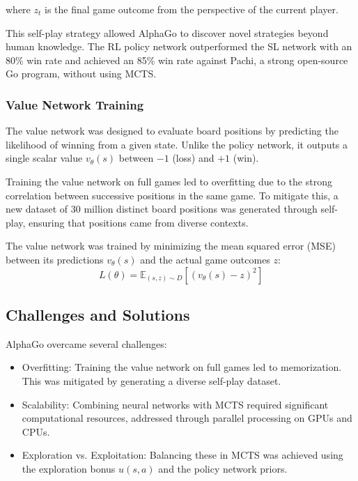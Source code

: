 where \( z_t \) is the final game outcome from the perspective of the current
player.

This self-play strategy allowed AlphaGo to discover novel strategies beyond
human knowledge. The RL policy network outperformed the SL network with an 80\%
win rate and achieved an 85\% win rate against Pachi, a strong open-source Go
program, without using MCTS.

\subsubsection{Value Network Training}
The value network was designed to evaluate board positions by predicting the
likelihood of winning from a given state. Unlike the policy network, it outputs
a single scalar value \( v_\theta(s) \) between \(-1\) (loss) and \(+1\) (win).

Training the value network on full games led to overfitting due to the strong
correlation between successive positions in the same game. To mitigate this, a
new dataset of 30 million distinct board positions was generated through
self-play, ensuring that positions came from diverse contexts.

The value network was trained by minimizing the mean squared error (MSE)
between its predictions \( v_\theta(s) \) and the actual game outcomes \( z \):
\begin{equation}
    L(\theta) = \mathbb{E}_{(s, z) \sim D} \left[ (v_\theta(s) - z)^2 \right]
\end{equation}
\subsection{Challenges and Solutions}
AlphaGo overcame several challenges:
\begin{itemize}
    \item Overfitting: Training the value network on full games led to memorization. This
          was mitigated by generating a diverse self-play dataset.
    \item Scalability: Combining neural networks with MCTS required significant
          computational resources, addressed through parallel processing on GPUs and
          CPUs.
    \item Exploration vs. Exploitation: Balancing these in MCTS was achieved using the
          exploration bonus \( u(s, a) \) and the policy network priors.
\end{itemize}

